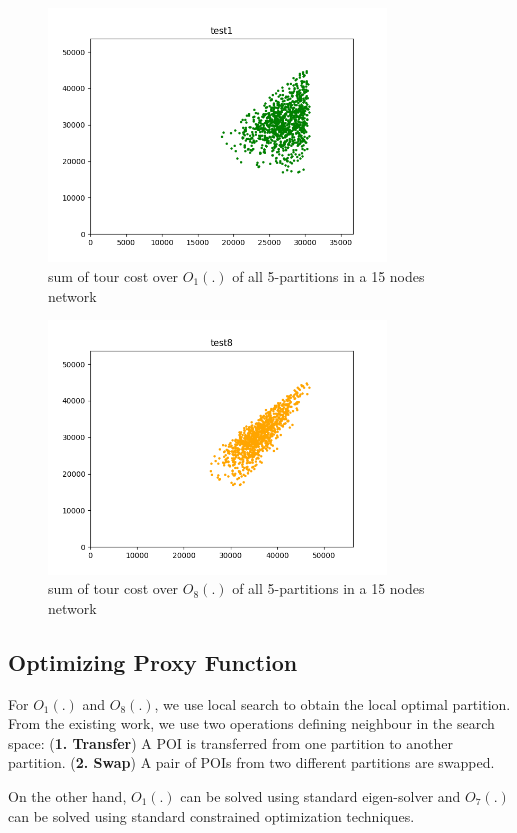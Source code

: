 \begin{figure}[h!]
\centering
\includegraphics[width=0.8\textwidth]{assets/test1sum.png}
\caption{sum of tour cost over $O_1(.)$ of all 5-partitions in a 15 nodes network}
\label{fig:test1sum}
\end{figure}

\begin{figure}[h!]
\centering
\includegraphics[width=0.8\textwidth]{assets/test8sum.png}
\caption{sum of tour cost over $O_8(.)$ of all 5-partitions in a 15 nodes network}
\label{fig:test8sum}
\end{figure}

\subsection{Optimizing Proxy Function}

For $O_1(.)$ and $O_8(.)$, we use local search to obtain the local optimal partition. From the existing work, we use two operations defining neighbour in the search space: (\textbf{1. Transfer}) A POI is transferred from one partition to another partition. (\textbf{2. Swap}) A pair of POIs from two different partitions are swapped.

On the other hand, $O_1(.)$ can be solved using standard eigen-solver and $O_7(.)$ can be solved using standard constrained optimization techniques.
